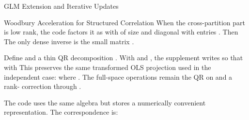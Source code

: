 \begin{Section}{GLM Extension and Iterative Updates}
\begin{SubSection}{Woodbury Acceleration for Structured Correlation}
When the cross-partition part is low rank, the code factors it as
with  of size  and 
diagonal with entries . Then
The only dense inverse is the small  matrix
.

Define  and a
thin QR decomposition . With
 and
,
the supplement writes
so that
with
This preserves the same transformed OLS projection used in the
independent case:
where .
The full-space operations remain the QR on  and a
rank- correction through .

 The code uses the same algebra but stores a
numerically convenient representation. The correspondence is:
\begin{itemize}


\end{itemize}
\end{SubSection}
\end{Section}
